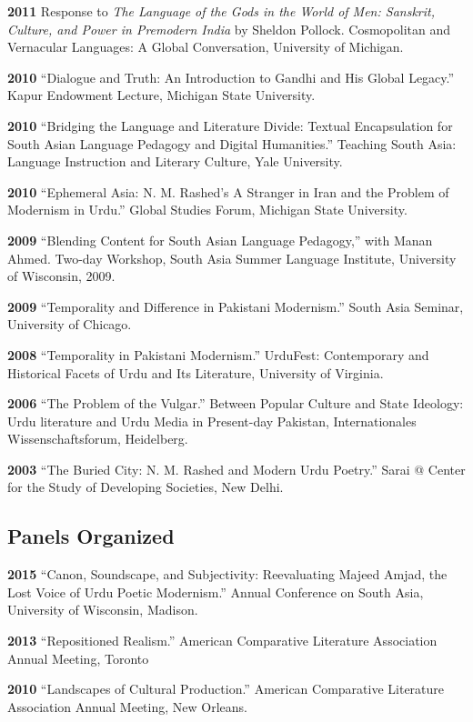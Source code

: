 \documentclass[letterpaper,12pt]{article}
\begin{document}
\textbf{2011}
Response to \emph{The Language of the Gods in the World of Men:
Sanskrit, Culture, and Power in Premodern India} by Sheldon Pollock.
Cosmopolitan and Vernacular Languages: A Global Conversation, University of Michigan.

\textbf{2010}
“Dialogue and Truth: An Introduction to Gandhi and His Global Legacy.”
Kapur Endowment Lecture, Michigan State University.

\textbf{2010}
“Bridging the Language and Literature Divide:
Textual Encapsulation for South Asian Language Pedagogy and Digital Humanities.”
Teaching South Asia: Language Instruction and Literary Culture, Yale University.

\textbf{2010}
“Ephemeral Asia:
N. M. Rashed’s A Stranger in Iran and the Problem of Modernism in Urdu.”
Global Studies Forum, Michigan State University.

\textbf{2009}
“Blending Content for South Asian Language Pedagogy,”
with Manan Ahmed.
Two-day Workshop, South Asia Summer Language Institute,
University of Wisconsin, 2009.

\textbf{2009}
“Temporality and Difference in Pakistani Modernism.”
South Asia Seminar, University of Chicago.

\textbf{2008}
“Temporality in Pakistani Modernism.”
UrduFest: Contemporary and Historical Facets of Urdu and Its Literature,
University of Virginia.

\textbf{2006}
“The Problem of the Vulgar.”
Between Popular Culture and State Ideology:
Urdu literature and Urdu Media in Present-day Pakistan,
Internationales Wissenschaftsforum, Heidelberg.

\textbf{2003}
“The Buried City: N. M. Rashed and Modern Urdu Poetry.”
Sarai @ Center for the Study of Developing Societies, New Delhi.


\subsection{Panels Organized%
  \label{panels-organized}%
}

\textbf{2015}
“Canon, Soundscape, and Subjectivity: Reevaluating Majeed Amjad, the Lost Voice of Urdu Poetic Modernism.”
Annual Conference on South Asia, University of Wisconsin, Madison.

\textbf{2013}
“Repositioned Realism.”
American Comparative Literature Association Annual Meeting, Toronto

\textbf{2010}
“Landscapes of Cultural Production.”
American Comparative Literature Association Annual Meeting, New Orleans.
\end{document}

